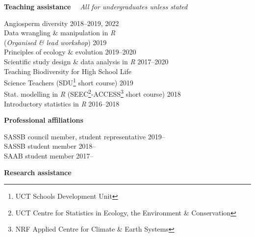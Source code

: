 \documentclass[10pt]{article}
\begin{document}
\begin{multicols}{2}
\columnbreak

\textbf{Teaching assistance} %
  ~~{\small \textmd{\textit{All for undergraduates unless stated}}}

Angiosperm diversity                         \hfill {\small 2018--2019, 2022} \\
Data wrangling \& manipulation in \textit{R}                                  \\
\hspace{2em} (\textit{Organised \& lead
  workshop})                                 \hfill {\small             2019} \\
Principles of ecology \& evolution           \hfill {\small       2019--2020} \\
Scientific study design \& data analysis in
  \textit{R}                                 \hfill {\small       2017--2020} \\
Teaching Biodiversity for High School Life                                    \\
\hspace{2em} Science Teachers {\small
  (SDU\footnote{UCT Schools Development Unit}
  short course)}                             \hfill {\small             2019} \\
Stat. modelling in \textit{R} {\small
  (SEEC\footnote{UCT Centre for Statistics in
  Ecology, the Environment \&
  Conservation}-ACCESS\footnote{NRF Applied
  Centre for Climate \& Earth Systems} short
  course)}                                   \hfill {\small             2018} \\
Introductory statistics in \textit{R}        \hfill {\small       2016--2018}

\vfill

\textbf{Professional affiliations} %

SASSB council member, student representative           \hfill {\small 2019--} \\
SASSB student member                                   \hfill {\small 2018--} \\
SAAB student member                                    \hfill {\small 2017--}

\end{multicols}

\textbf{Research assistance} %
\end{document}
